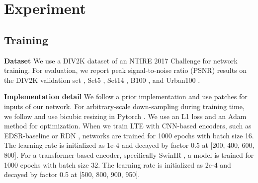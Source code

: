 \documentclass[10pt,twocolumn,letterpaper]{article}
\begin{document}
\section{Experiment}

\subsection{Training}
\textbf{Dataset} We use a DIV2K dataset \cite{8014884} of an NTIRE 2017 Challenge \cite{8014883} for network training. For evaluation, we report peak signal-to-noise ratio (PSNR) results on the DIV2K validation set \cite{8014884}, Set5 \cite{bevilacqua2012low}, Set14 \cite{zeyde2010single}, B100 \cite{martin2001database}, and Urban100 \cite{7299156}.

\textbf{Implementation detail} We follow a prior implementation \cite{Lim_2017_CVPR_Workshops} and use  patches for inputs of our network. For arbitrary-scale down-sampling during training time, we follow \cite{chen2021learning} and use bicubic resizing in Pytorch \cite{paszke2019pytorch}. We use an L1 loss \cite{Lim_2017_CVPR_Workshops} and an Adam \cite{DBLP:journals/corr/KingmaB14} method for optimization. When we train LTE with CNN-based encoders, such as EDSR-baseline \cite{Lim_2017_CVPR_Workshops} or RDN \cite{zhang2018residual}, networks are trained for 1000 epochs with batch size 16. The learning rate is initialized as 1e-4 and decayed by factor 0.5 at [200, 400, 600, 800]. For a transformer-based encoder, specifically SwinIR \cite{liang2021swinir}, a model is trained for 1000 epochs with batch size 32. The learning rate is initialized as 2e-4 and decayed by factor 0.5 at [500, 800, 900, 950].
\end{document}

